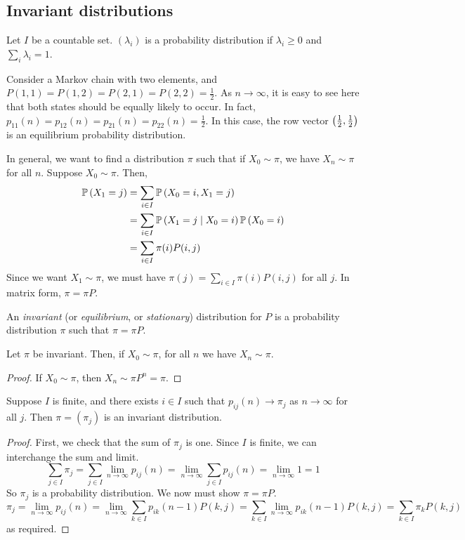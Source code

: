 \subsection{Invariant distributions}
Let \( I \) be a countable set.
\( (\lambda_i) \) is a probability distribution if \( \lambda_i \geq 0 \) and \( \sum_i \lambda_i = 1 \).
\begin{example}
	Consider a Markov chain with two elements, and \( P(1,1) = P(1,2) = P(2,1) = P(2,2) = \frac{1}{2} \).
	As \( n \to \infty \), it is easy to see here that both states should be equally likely to occur.
	In fact, \( p_{11}(n) = p_{12}(n) = p_{21}(n) = p_{22}(n) = \frac{1}{2} \).
	In this case, the row vector \( \qty(\frac{1}{2}, \frac{1}{2}) \) is an equilibrium probability distribution.
\end{example}
In general, we want to find a distribution \( \pi \) such that if \( X_0 \sim \pi \), we have \( X_n \sim \pi \) for all \( n \).
Suppose \( X_0 \sim \pi \).
Then,
\begin{align*}
	\mathbb{P}\left({X_1 = j}\right) & = \sum_{i \in I} \mathbb{P}\left({X_0 = i, X_1 = j}\right)                   \\
	               & = \sum_{i \in I} \mathbb{P}\left({X_1 = j \mid X_0 = i}\right)\mathbb{P}\left({X_0 = i}\right) \\
	               & = \sum_{i \in I} \pi(i) P(i,j)
\end{align*}
Since we want \( X_1 \sim \pi \), we must have \( \pi(j) = \sum_{i \in I} \pi(i) P(i,j) \) for all \( j \).
In matrix form, \( \pi = \pi P \).
\begin{definition}
	An \textit{invariant} (or \textit{equilibrium}, or \textit{stationary}) distribution for \( P \) is a probability distribution \( \pi \) such that \( \pi = \pi P \).
\end{definition}
\begin{theorem}
	Let \( \pi \) be invariant.
	Then, if \( X_0 \sim \pi \), for all \( n \) we have \( X_n \sim \pi \).
\end{theorem}
\begin{proof}
	If \( X_0 \sim \pi \), then \( X_n \sim \pi P^n = \pi \).
\end{proof}
\begin{theorem}
	Suppose \( I \) is finite, and there exists \( i \in I \) such that \( p_{ij}(n) \to \pi_j \) as \( n \to \infty \) for all \( j \).
	Then \( \pi = (\pi_j) \) is an invariant distribution.
\end{theorem}
\begin{proof}
	First, we check that the sum of \( \pi_j \) is one.
	Since \( I \) is finite, we can interchange the sum and limit.
	\[
		\sum_{j \in I} \pi_j = \sum_{j \in I} \lim_{n \to \infty} p_{ij}(n) = \lim_{n \to \infty} \sum_{j \in I} p_{ij}(n) = \lim_{n \to \infty} 1 = 1
	\]
	So \( \pi_j \) is a probability distribution.
	We now must show \( \pi = \pi P \).
	\[
		\pi_j = \lim_{n \to \infty} p_{ij}(n) = \lim_{n \to \infty} \sum_{k \in I} p_{ik}(n-1) P(k,j) = \sum_{k \in I} \lim_{n \to \infty} p_{ik}(n-1) P(k,j) = \sum_{k \in I} \pi_k P(k,j)
	\]
	as required.
\end{proof}

